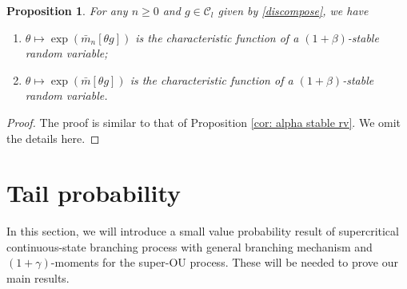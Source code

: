\documentclass[12pt,a4paper]{amsart}
\theoremstyle{plain}
\newtheorem{prop}[thm]{Proposition}
\theoremstyle{definition}
\numberwithin{equation}{section}
\begin{document}
\begin{prop}
\label{cor: alpha stable rv 1}
For any $n\geq 0$ and $g\in \mathcal C_l$ given by \eqref{discompose}, we have
\begin{enumerate}
\item
\label{it: first stable}
    $\theta \mapsto \exp(\bar{m}_n[\theta g])$ is the characteristic function of a $(1+\beta)$-stable random variable;
\item
\label{it: second stable}
    $\theta \mapsto \exp(\bar m[\theta g])$ is the characteristic function of a $(1+\beta)$-stable random variable.
\end{enumerate}
\end{prop}
\begin{proof}
The proof is similar to that of Proposition \ref{cor: alpha stable rv}. We omit the details here.
\end{proof}

\section{Tail probability}
In this section, we will introduce a small value probability result of supercritical continuous-state branching process with general branching mechanism and
$(1+\gamma)$-moments for the super-OU process. These will be needed to prove our main results.
\end{document}
